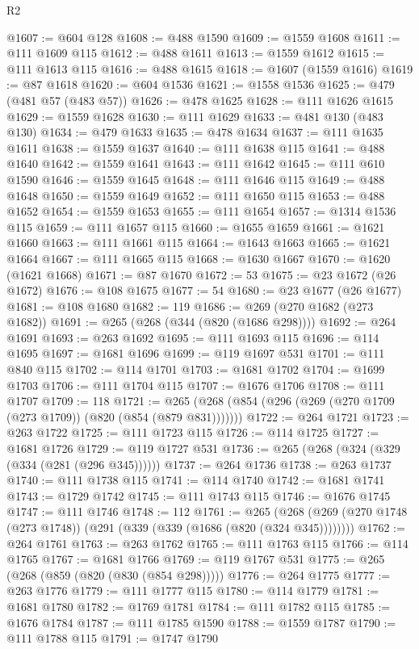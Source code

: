 \begin{lexlean}{R2}
\begin{coremodule}
@1607 := @604 @128
@1608 := @488 @1590
@1609 := @1559 @1608
@1611 := @111 @1609 @115
@1612 := @488 @1611
@1613 := @1559 @1612
@1615 := @111 @1613 @115
@1616 := @488 @1615
@1618 := @1607 (@1559 @1616)
@1619 := @87 @1618
@1620 := @604 @1536
@1621 := @1558 @1536
@1625 := @479 (@481 @57 (@483 @57))
@1626 := @478 @1625
@1628 := @111 @1626 @1615
@1629 := @1559 @1628
@1630 := @111 @1629
@1633 := @481 @130 (@483 @130)
@1634 := @479 @1633
@1635 := @478 @1634
@1637 := @111 @1635 @1611
@1638 := @1559 @1637
@1640 := @111 @1638 @115
@1641 := @488 @1640
@1642 := @1559 @1641
@1643 := @111 @1642
@1645 := @111 @610 @1590
@1646 := @1559 @1645
@1648 := @111 @1646 @115
@1649 := @488 @1648
@1650 := @1559 @1649
@1652 := @111 @1650 @115
@1653 := @488 @1652
@1654 := @1559 @1653
@1655 := @111 @1654
@1657 := @1314 @1536 @115
@1659 := @111 @1657 @115
@1660 := @1655 @1659
@1661 := @1621 @1660
@1663 := @111 @1661 @115
@1664 := @1643 @1663
@1665 := @1621 @1664
@1667 := @111 @1665 @115
@1668 := @1630 @1667
@1670 := @1620 (@1621 @1668)
@1671 := @87 @1670
@1672 := 53
@1675 := @23 @1672 (@26 @1672)
@1676 := @108 @1675
@1677 := 54
@1680 := @23 @1677 (@26 @1677)
@1681 := @108 @1680
@1682 := 119
@1686 := @269 (@270 @1682 (@273 @1682))
@1691 := @265 (@268 (@344 (@820 (@1686 @298))))
@1692 := @264 @1691
@1693 := @263 @1692
@1695 := @111 @1693 @115
@1696 := @114 @1695
@1697 := @1681 @1696
@1699 := @119 @1697 @531
@1701 := @111 @840 @115
@1702 := @114 @1701
@1703 := @1681 @1702
@1704 := @1699 @1703
@1706 := @111 @1704 @115
@1707 := @1676 @1706
@1708 := @111 @1707
@1709 := 118
@1721 := @265 (@268 (@854 (@296 (@269 (@270 @1709 (@273 @1709)) (@820 (@854 (@879 @831)))))))
@1722 := @264 @1721
@1723 := @263 @1722
@1725 := @111 @1723 @115
@1726 := @114 @1725
@1727 := @1681 @1726
@1729 := @119 @1727 @531
@1736 := @265 (@268 (@324 (@329 (@334 (@281 (@296 @345))))))
@1737 := @264 @1736
@1738 := @263 @1737
@1740 := @111 @1738 @115
@1741 := @114 @1740
@1742 := @1681 @1741
@1743 := @1729 @1742
@1745 := @111 @1743 @115
@1746 := @1676 @1745
@1747 := @111 @1746
@1748 := 112
@1761 := @265
    (@268 (@269 (@270 @1748 (@273 @1748)) (@291 (@339 (@339 (@1686 (@820 (@324 @345))))))))
@1762 := @264 @1761
@1763 := @263 @1762
@1765 := @111 @1763 @115
@1766 := @114 @1765
@1767 := @1681 @1766
@1769 := @119 @1767 @531
@1775 := @265 (@268 (@859 (@820 (@830 (@854 @298)))))
@1776 := @264 @1775
@1777 := @263 @1776
@1779 := @111 @1777 @115
@1780 := @114 @1779
@1781 := @1681 @1780
@1782 := @1769 @1781
@1784 := @111 @1782 @115
@1785 := @1676 @1784
@1787 := @111 @1785 @1590
@1788 := @1559 @1787
@1790 := @111 @1788 @115
@1791 := @1747 @1790

\end{coremodule}
\end{lexlean}
